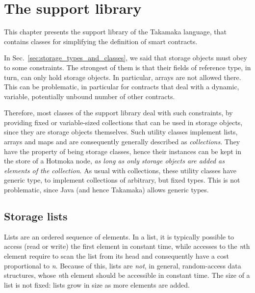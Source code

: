 \chapter{The support library}\label{ch:support_library}

This chapter presents the support library of the Takamaka language,
that contains classes for simplifying the definition of smart contracts.

In Sec.~\ref{sec:storage_types_and_classes},
we said that storage objects must obey to some constraints.
The strongest of them is that their fields of reference type, in turn, can only hold
storage objects. In particular, arrays are not allowed there. This can
be problematic, in particular for contracts that deal with a
dynamic, variable, potentially unbound number of other contracts.

Therefore, most classes of the support library deal
with such constraints, by providing fixed or variable-sized collections
that can be used in storage objects, since they are storage objects themselves.
Such utility classes implement lists, arrays and maps and are
consequently generally described as \emph{collections}. They have the
property of being storage classes, hence their instances can be kept in
the store of a Hotmoka node,
\emph{as long as only storage objects are added as elements of the collection}.
As usual with collections, these utility classes
have generic type, to implement collections of arbitrary, but fixed
types. This is not problematic, since Java (and hence Takamaka) allows generic types.

\section{Storage lists}\label{sec:storage_lists}

Lists are an ordered sequence of elements. In a list, it is typically
possible to access (read or write) the first element in constant time, while accesses
to the \emph{n}th element require to scan the list from its head and
consequently have a cost proportional to \emph{n}. Because of this,
lists are \emph{not}, in general, random-access data structures, whose \emph{n}th
element should be accessible in constant time.
The size of a list is not fixed: lists grow in size as more elements are added.

